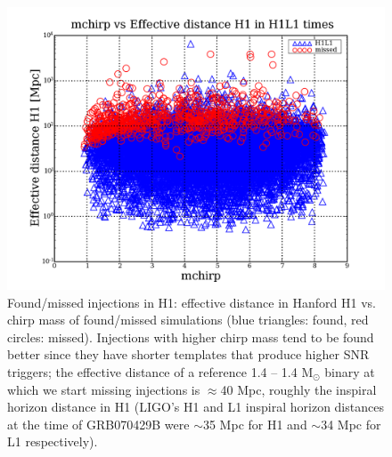 \begin{figure}[ht!]
\centering
\includegraphics[scale=0.35]{Images/Foundmissed_INJ_H1.png}
\caption{Found/missed injections in H1: effective distance in Hanford H1 vs. chirp mass of found/missed simulations (blue triangles: found, red circles: missed). Injections with higher chirp mass tend to be found better since they have shorter templates that produce higher SNR triggers; the effective distance of a reference 1.4 -- 1.4 $\mathrm{M}_{\odot}$ binary at which we start missing injections is $\approx$40 Mpc, roughly the inspiral horizon distance in H1 (LIGO's H1 and L1 inspiral horizon distances at the time of GRB070429B were $\sim$35 Mpc for H1 and $\sim$34 Mpc for L1 respectively).}
\label{injectionsH1}
\end{figure}

